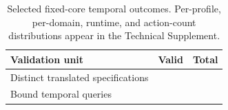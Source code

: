\begin{table}[htbp]
\centering
\small
\setlength{\tabcolsep}{2.8pt}
\begin{tabular}{lrr}
\toprule
Validation unit & Valid & Total \\
\midrule
Distinct translated specifications & \TranslationEquivalentCount{} &
\TranslationInputCount{} \\
Bound temporal queries & \TEGProblemCount{} & \TEGProblemCount{} \\
\bottomrule
\end{tabular}
\caption{Selected fixed-core temporal outcomes. Per-profile, per-domain,
runtime, and action-count distributions appear in the Technical Supplement.}
\label{tab:temporal-summary}
\end{table}
